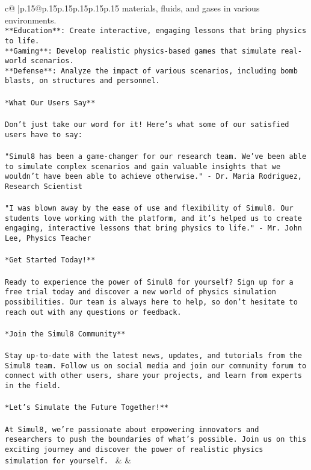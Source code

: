 \documentclass{article}
\begin{document}
{\begin{supertabular}{c@{$\;$}|p{.15\linewidth}@{}p{.15\linewidth}p{.15\linewidth}p{.15\linewidth}p{.15\linewidth}p{.15\linewidth}}
{{{materials, fluids, and gases in various environments.\\ \tt * **Education**: Create interactive, engaging lessons that bring physics to life.\\ \tt * **Gaming**: Develop realistic physics-based games that simulate real-world scenarios.\\ \tt * **Defense**: Analyze the impact of various scenarios, including bomb blasts, on structures and personnel.\\ \tt \\ \tt **What Our Users Say**\\ \tt \\ \tt Don't just take our word for it! Here's what some of our satisfied users have to say:\\ \tt \\ \tt "Simul8 has been a game-changer for our research team. We've been able to simulate complex scenarios and gain valuable insights that we wouldn't have been able to achieve otherwise." - Dr. Maria Rodriguez, Research Scientist\\ \tt \\ \tt "I was blown away by the ease of use and flexibility of Simul8. Our students love working with the platform, and it's helped us to create engaging, interactive lessons that bring physics to life." - Mr. John Lee, Physics Teacher\\ \tt \\ \tt **Get Started Today!**\\ \tt \\ \tt Ready to experience the power of Simul8 for yourself? Sign up for a free trial today and discover a new world of physics simulation possibilities. Our team is always here to help, so don't hesitate to reach out with any questions or feedback.\\ \tt \\ \tt **Join the Simul8 Community**\\ \tt \\ \tt Stay up-to-date with the latest news, updates, and tutorials from the Simul8 team. Follow us on social media and join our community forum to connect with other users, share your projects, and learn from experts in the field.\\ \tt \\ \tt **Let's Simulate the Future Together!**\\ \tt \\ \tt At Simul8, we're passionate about empowering innovators and researchers to push the boundaries of what's possible. Join us on this exciting journey and discover the power of realistic physics simulation for yourself. 
	  } 
	   } 
	   } 
	 & & \\ 
 


\end{supertabular}}
\end{document}
